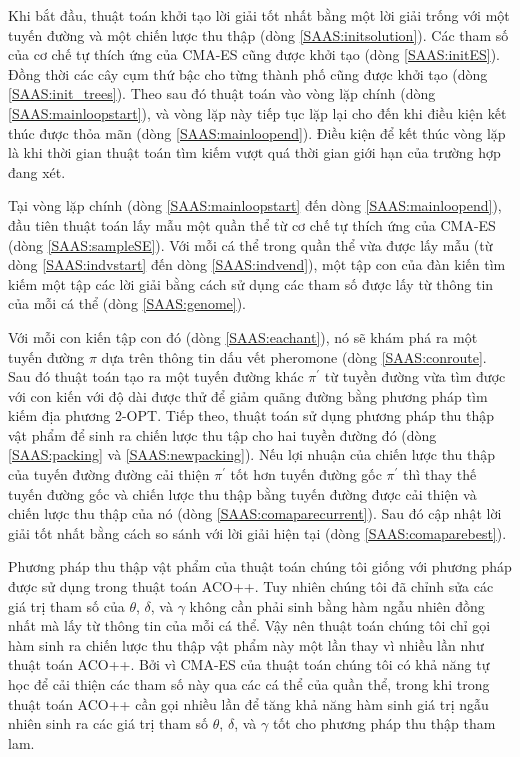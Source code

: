 Khi bắt đầu, thuật toán khởi tạo lời giải tốt nhất bằng một lời giải trống với một tuyến đường và một chiến lược thu thập (dòng \ref{SAAS:initsolution}). Các tham số của cơ chế tự thích ứng của CMA-ES cũng được khởi tạo (dòng \ref{SAAS:initES}). Đồng thời các cây cụm thứ bậc cho từng thành phố cũng được khởi tạo (dòng \ref{SAAS:init_trees}). Theo sau đó thuật toán vào vòng lặp chính (dòng \ref{SAAS:mainloopstart}), và vòng lặp này tiếp tục lặp lại cho đến khi điều kiện kết thúc được thỏa mãn (dòng \ref{SAAS:mainloopend}). Điều kiện để kết thúc vòng lặp là khi thời gian thuật toán tìm kiếm vượt quá thời gian giới hạn của trường hợp đang xét.

Tại vòng lặp chính (dòng \ref{SAAS:mainloopstart} đến dòng \ref{SAAS:mainloopend}), đầu tiên thuật toán lấy mẫu một quần thể từ cơ chế tự thích ứng của CMA-ES (dòng \ref{SAAS:sampleSE}). Với mỗi cá thể trong quần thể vừa được lấy mẫu (từ dòng \ref{SAAS:indvstart} đến dòng \ref{SAAS:indvend}), một tập con của đàn kiến tìm kiếm một tập các lời giải bằng cách sử dụng các tham số được lấy từ thông tin của mỗi cá thể (dòng \ref{SAAS:genome}). 

Với mỗi con kiến tập con đó (dòng \ref{SAAS:eachant}), nó sẽ khám phá ra một tuyến đường $\pi$ dựa trên thông tin dấu vết pheromone (dòng \ref{SAAS:conroute}. Sau đó thuật toán tạo ra một tuyến đường khác $\pi^{'}$ từ tuyền đường vừa tìm được với con kiến với độ dài được thử để giảm quãng đường bằng phương pháp tìm kiếm địa phương 2-OPT\cite{Crama1995}. Tiếp theo, thuật toán sử dụng phương pháp thu thập vật phẩm để sinh ra chiến lược thu tập cho hai tuyền đường đó (dòng \ref{SAAS:packing} và \ref{SAAS:newpacking}). Nếu lợi nhuận của chiến lược thu thập của tuyến đường đường cải thiện $\pi^{'}$ tốt hơn tuyến đường gốc $\pi^{'}$ thì thay thế tuyến đường gốc và chiến lược thu thập bằng tuyến đường được cải thiện và chiến lược thu thập của nó (dòng \ref{SAAS:comaparecurrent}). Sau đó cập nhật lời giải tốt nhất bằng cách so sánh với lời giải hiện tại (dòng \ref{SAAS:comaparebest}).

Phương pháp thu thập vật phẩm của thuật toán chúng tôi giống với phương pháp được sử dụng trong thuật toán ACO++\cite{Chagas2021}. Tuy nhiên chúng tôi đã chỉnh sửa các giá trị tham số của $\theta$, $\delta$, và $\gamma$ không cần phải sinh bằng hàm ngẫu nhiên đồng nhất mà lấy từ thông tin của mỗi cá thể. Vậy nên thuật toán chúng tôi chỉ gọi hàm sinh ra chiến lược thu thập vật phẩm này một lần thay vì nhiều lần như thuật toán ACO++. Bởi vì CMA-ES của thuật toán chúng tôi có khả năng tự học để cải thiện các tham số này qua các cá thể của quần thể, trong khi trong thuật toán ACO++ cần gọi nhiều lần để tăng khả năng hàm sinh giá trị ngẫu nhiên sinh ra các giá trị tham số $\theta$, $\delta$, và $\gamma$ tốt cho phương pháp thu thập tham lam.

